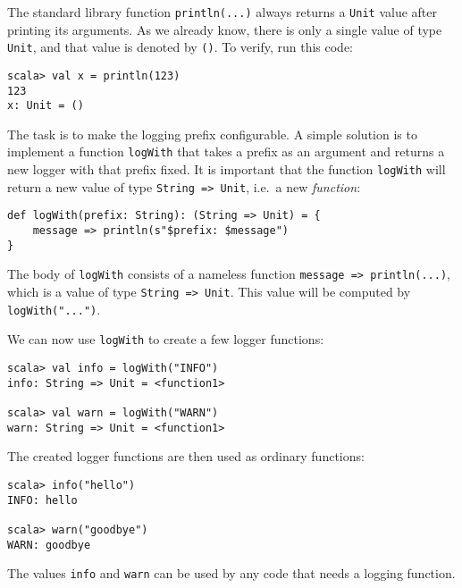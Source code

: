 The standard library function \lstinline!println(...)!
always returns a \lstinline!Unit!
value after printing its arguments. As we already know, there is only
a single value of type \lstinline!Unit!,
and that value is denoted by \lstinline!()!.
To verify, run this code:
\begin{lstlisting}
scala> val x = println(123)
123
x: Unit = ()
\end{lstlisting}
The task is to make the logging prefix configurable. A simple solution
is to implement a function \lstinline!logWith!
that takes a prefix as an argument and returns a new logger with that
prefix fixed. It is important that the function \lstinline!logWith!
will return a new value of type \lstinline!String => Unit!,
i.e.~a new \emph{function}:
\begin{lstlisting}
def logWith(prefix: String): (String => Unit) = {
    message => println(s"$prefix: $message")
}
\end{lstlisting}
The body of \lstinline!logWith!
consists of a nameless function \lstinline!message => println(...)!,
which is a value of type \lstinline!String => Unit!.
This value will be computed by \lstinline!logWith("...")!.

We can now use \lstinline!logWith!
to create a few logger functions:
\begin{lstlisting}
scala> val info = logWith("INFO")
info: String => Unit = <function1>

scala> val warn = logWith("WARN")
warn: String => Unit = <function1>
\end{lstlisting}
The created logger functions are then used as ordinary functions:
\begin{lstlisting}
scala> info("hello")
INFO: hello

scala> warn("goodbye")
WARN: goodbye
\end{lstlisting}
The values \lstinline!info!
and \lstinline!warn! can
be used by any code that needs a logging function.

